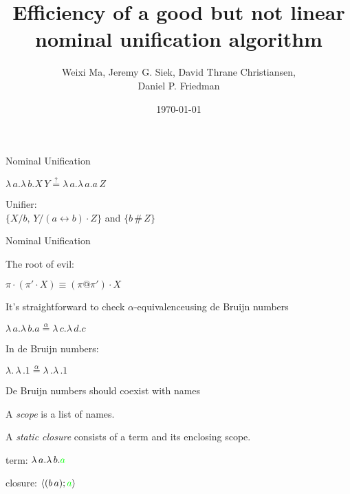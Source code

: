 \documentclass[pdf]{beamer}
\date{\today}
\title{Efficiency of a good but not linear nominal unification algorithm}
\author{Weixi Ma, Jeremy G. Siek, David Thrane Christiansen,\\ Daniel P. Friedman}
\newcommand{\bd}[2] {
 #1/ #2
}
\newcommand{\clos}[2] {
\langle #2; #1 \rangle
}
\newcommand{\app}[2] {
#1\, #2
}
\newcommand{\swap}[2] {
  #1\leftrightarrow#2
}
\newcommand{\alphaeq}[2] {
  #1\stackrel{\alpha}{=}#2
}
\begin{document}


\begin{frame}
  \maketitle
\end{frame}

\begin{frame}{Nominal Unification~\citep{urban_nominal_2004}}
  
  {\centering
    $\lambda\,a.\lambda\,b.\app{X}{Y} \stackrel{?}{=} \lambda\,a.\lambda\,a.\app{a}{Z}$
    \par}
  \vspace{1cm}
  {\centering
    Unifier:\\
    $\{\bd{X}{b},\,\bd{Y}{(\swap{a}{b})\cdot Z}\}$ and $\{b\,\#\,Z\}$
    \par}
\end{frame}

\begin{frame}{Nominal Unification~\citep{urban_nominal_2004}}

  {\centering
  The root of evil:
  \par}
  {\centering
    $\pi\cdot(\pi'\cdot X) \equiv (\pi@\pi')\cdot X$
  \par}
\end{frame}

\begin{frame}{It's straightforward to check $\alpha$-equivalence}{using de Bruijn numbers~\citep{de_bruijn_lambda_1972}}
 
 {\centering
   $\alphaeq{\lambda\,a.\lambda\,b.a}{\lambda\,c.\lambda\,d.c}$
 \par}
\vspace{1cm}
  {\centering
  In de Bruijn numbers:\par}
 {\centering
   $\alphaeq{\lambda.\,\lambda\,.1}{\lambda\,.\lambda\,.1}$
 \par}
\end{frame}

\begin{frame}{De Bruijn numbers should coexist with names}

  {\centering
    A \emph{scope} is a list of names.
  \par}
  {\centering
    A \emph{static closure} consists of {\color{green}a term} and its enclosing scope. \\
  \par}
  \vspace{1cm}
  
  {\centering term: $\lambda\,a.\lambda\,b.{\color{green}a}$
  \par}

{\centering
 closure: $\clos{{\color{green}a}}{(b\,a)}$
\par}
\end{frame}
\end{document}

